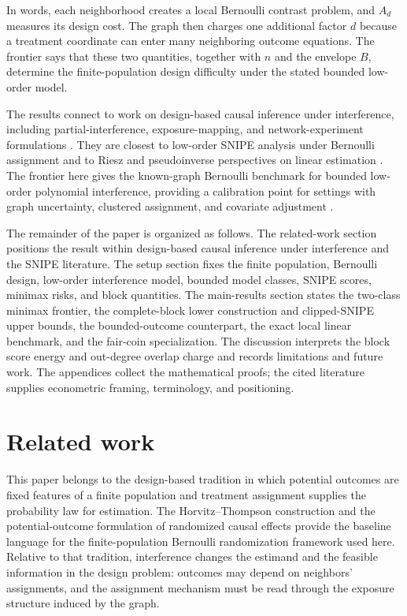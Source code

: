 \documentclass[11pt]{article}
\begin{document}
In words, each neighborhood creates a local Bernoulli contrast problem, and \(A_d\) measures its design cost. The graph then charges one additional factor \(d\) because a treatment coordinate can enter many neighboring outcome equations. The frontier says that these two quantities, together with \(n\) and the envelope \(B\), determine the finite-population design difficulty under the stated bounded low-order model.

The results connect to work on design-based causal inference under interference, including partial-interference, exposure-mapping, and network-experiment formulations \citep{Sobel2006,HudgensHalloran2008,Bowers2013,Ugander2013,Aronow2017,Eckles2017,Ogburn2017}. They are closest to low-order SNIPE analysis under Bernoulli assignment \citep{CortezRodriguezEichhornYu2023} and to Riesz and pseudoinverse perspectives on linear estimation \citep{Swaminathan2017,HarshawSavjeWang2025}. The frontier here gives the known-graph Bernoulli benchmark for bounded low-order polynomial interference, providing a calibration point for settings with graph uncertainty, clustered assignment, and covariate adjustment \citep{YuAiroldiBorgsChayes2022,EichhornKhanUganderYu2026,WangLi2026}.

The remainder of the paper is organized as follows. The related-work section positions the result within design-based causal inference under interference and the SNIPE literature. The setup section fixes the finite population, Bernoulli design, low-order interference model, bounded model classes, SNIPE scores, minimax risks, and block quantities. The main-results section states the two-class minimax frontier, the complete-block lower construction and clipped-SNIPE upper bounds, the bounded-outcome counterpart, the exact local linear benchmark, and the fair-coin specialization. The discussion interprets the block score energy and out-degree overlap charge and records limitations and future work. The appendices collect the mathematical proofs; the cited literature supplies econometric framing, terminology, and positioning.


\section{Related work}

This paper belongs to the design-based tradition in which potential outcomes are fixed features of a finite population and treatment assignment supplies the probability law for estimation. The Horvitz--Thompson construction \citep{HorvitzThompson1952} and the potential-outcome formulation of randomized causal effects \citep{Rubin1978,ImbensRubin2015} provide the baseline language for the finite-population Bernoulli randomization framework used here. Relative to that tradition, interference changes the estimand and the feasible information in the design problem: outcomes may depend on neighbors' assignments, and the assignment mechanism must be read through the exposure structure induced by the graph.
\end{document}
